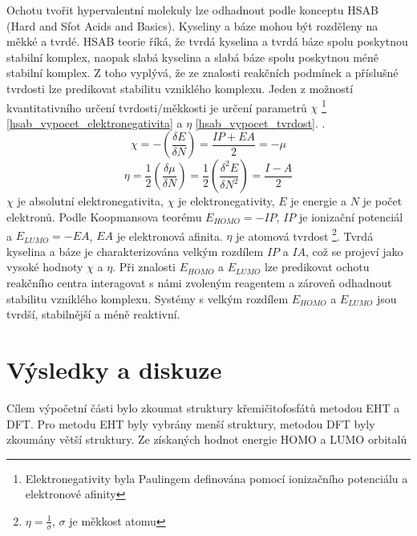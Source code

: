 \documentclass[
  digital, %
  table,   %
  lof,     %
  lot,     %
]{fithesis3}
\begin{document}
Ochotu tvořit hypervalentní molekuly lze odhadnout podle konceptu HSAB (Hard and Sfot Acids and Basics). Kyseliny a báze mohou být rozděleny na měkké a tvrdé. HSAB teorie říká, že tvrdá kyselina a tvrdá báze spolu poskytnou stabilní komplex, naopak slabá kyselina a slabá báze spolu poskytnou méně stabilní komplex. Z toho vyplývá, že ze znalosti reakčních podmínek a příslušné tvrdosti lze predikovat stabilitu vzniklého komplexu. Jeden z možností kvantitativního určení tvrdosti/měkkosti je určení parametrů $\chi$ \footnote{Elektronegativity byla Paulingem definována pomocí ionizačního potenciálu a elektronové afinity} \ref{hsab_vypocet_elektronegativita} a $\eta$ \ref{hsab_vypocet_tvrdost}. \cite{hsabclanek}. 
\begin{equation}
\chi = - \left( \frac{\delta E}{\delta N} \right) = \frac{IP + EA}{2} = -\mu
\label{hsab_vypocet_elektronegativita}
\end{equation} 
\begin{equation}
\eta = \frac{1}{2} \left( \frac{\delta \mu}{\delta N} \right) = \frac{1}{2}\left( \frac{\delta^2 E}{\delta N^2} \right) = \frac{I - A}{2}
\label{hsab_vypocet_tvrdost}
\end{equation} 
$\chi$ je absolutní elektronegativita, $\chi$ je elektronegativity, $E$ je energie a $N$ je počet elektronů. \cite{hsabwatoc} Podle Koopmansova teorému $E_{HOMO} = - IP$, $IP$ je ionizační potenciál a $E_{LUMO} = -EA$, $EA$ je elektronová afinita.\cite{kratochvilexcerpta} $\eta$ je atomová tvrdost \footnote{$\eta = \frac{1}{\sigma}$, $\sigma$ je měkkost atomu}.\cite{pearson1986absolute} Tvrdá kyselina a báze je charakterizována velkým rozdílem $IP$ a $IA$, což se projeví jako vysoké hodnoty $\chi$ a $\eta$. Při znalosti $E_{HOMO}$ a $E_{LUMO}$ lze predikovat ochotu reakčního centra interagovat s námi zvoleným reagentem a zároveň odhadnout stabilitu vzniklého komplexu. Systémy s velkým rozdílem $E_{HOMO}$ a $E_{LUMO}$ jsou tvrdší, stabilnější a méně reaktivní.\cite{hsabwatoc}




\chapter{Výsledky a diskuze}
Cílem výpočetní části bylo zkoumat struktury křemičitofosfátů metodou EHT a DFT. Pro metodu EHT byly vybrány menší struktury, metodou DFT byly zkoumány větší struktury. Ze získaných hodnot energie HOMO a LUMO orbitalů 
\end{document}
